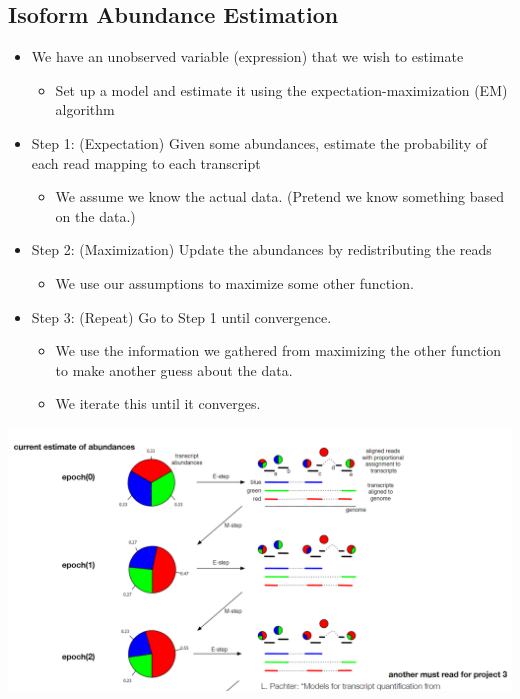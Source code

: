 \documentclass[10pt]{article}
\begin{document}
\subsection*{Isoform Abundance Estimation}
\begin{itemize}
    \item We have an unobserved variable (expression) that we wish to estimate
    \begin{itemize}
        \item Set up a model and estimate it using the expectation-maximization (EM) algorithm
    \end{itemize}
    \item Step 1: (Expectation) Given some abundances, estimate the probability of each read mapping to each transcript
    \begin{itemize}
        \item We assume we know the actual data. (Pretend we know something based on the data.)
    \end{itemize}
    \item Step 2: (Maximization) Update the abundances by redistributing the reads
    \begin{itemize}
        \item We use our assumptions to maximize some other function.
    \end{itemize}
    \item Step 3: (Repeat) Go to Step 1 until convergence.
    \begin{itemize}
        \item We use the information we gathered from maximizing the other function to make another guess about the data.
        \item We iterate this until it converges.
    \end{itemize}
\end{itemize}
\begin{center}
    \includegraphics*[scale=0.5]{W5_6.png}
\end{center}
\end{document}
